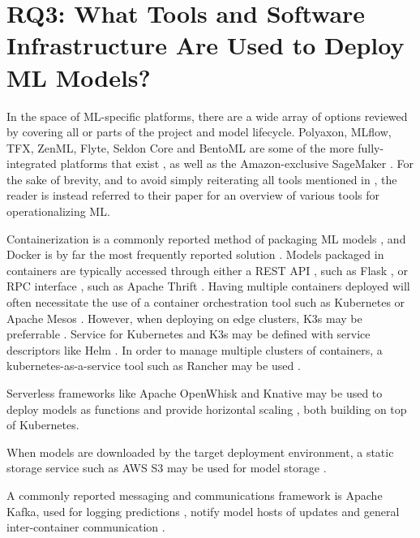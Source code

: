 \section{RQ3: What Tools and Software Infrastructure Are Used to Deploy ML Models?}
In the space of ML-specific platforms, there are a wide array of options reviewed by \cite{Ruf2021} covering all or parts of the project and model lifecycle.
Polyaxon, MLflow, TFX, ZenML, Flyte, Seldon Core and BentoML are some of the more fully-integrated platforms that exist \cite{Chen2020, Ruf2021}, as well as the Amazon-exclusive SageMaker \cite{Ruf2021, Chahal2020}.
For the sake of brevity, and to avoid simply reiterating all tools mentioned in \cite{Ruf2021}, the reader is instead referred to their paper for an overview of various tools for operationalizing ML.

Containerization is a commonly reported method of packaging ML models \cite{Ruf2021, Peticolas2019, Rausch2019}, and Docker is by far the most frequently reported solution \cite{Krishnamurthi2019, Richins2020, Li2017,Garcia2020,Crankshaw2017, Paeaekkoenen2020,Gupta2020}.
Models packaged in containers are typically accessed through either a REST API \cite{Garcia2020, Paeaekkoenen2020}, such as Flask \cite{Gupta2020}, or RPC interface \cite{Ruf2021, Crankshaw2017}, such as Apache Thrift \cite{Li2017}.
Having multiple containers deployed will often necessitate the use of a container orchestration tool such as Kubernetes \cite{Liu2020, Richins2020, Paeaekkoenen2020, Rausch2019a} or Apache Mesos \cite{Garcia2020}.
However, when deploying on edge clusters, K3s may be preferrable \cite{Paeaekkoenen2020}.
Service for Kubernetes and K3s may be defined with service descriptors like Helm \cite{Paeaekkoenen2020}.
In order to manage multiple clusters of containers, a kubernetes-as-a-service tool such as Rancher may be used \cite{Paeaekkoenen2020}.

Serverless frameworks like Apache OpenWhisk and Knative may be used to deploy models as functions and provide horizontal scaling \cite{Rausch2019a, Garcia2020}, both building on top of Kubernetes.

When models are downloaded by the target deployment environment, a static storage service such as AWS S3 may be used for model storage \cite{Liu2020, Chahal2020}.

A commonly reported messaging and communications framework is Apache Kafka, used for logging predictions \cite{Li2017}, notify model hosts of updates \cite{Liu2020,Garcia2020} and general inter-container communication \cite{Richins2020}.


